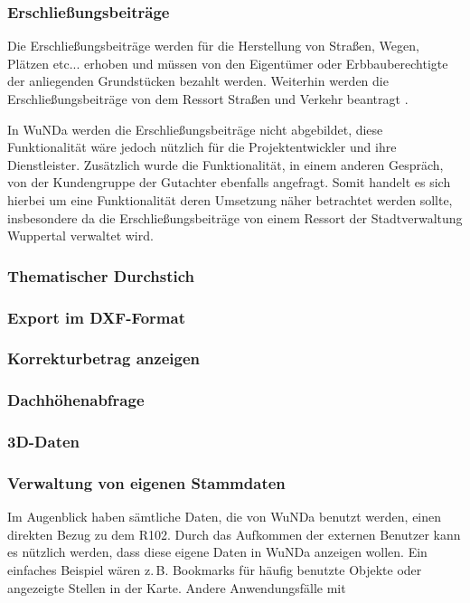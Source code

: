 \subsubsection{Erschließungsbeiträge}
Die Erschließungsbeiträge werden für die Herstellung von Straßen, Wegen, Plätzen etc... erhoben und müssen von den Eigentümer oder Erbbauberechtigte der anliegenden Grundstücken bezahlt werden.
Weiterhin werden die Erschließungsbeiträge von dem Ressort Straßen und Verkehr beantragt \autocite[vgl.][]{wupp-erschliessungsbeitrag}.

In \ac{WuNDa} werden die Erschließungsbeiträge nicht abgebildet, diese Funktionalität wäre jedoch nützlich für die Projektentwickler und ihre Dienstleister.
Zusätzlich wurde die Funktionalität, in einem anderen Gespräch, von der Kundengruppe der Gutachter ebenfalls angefragt.
Somit handelt es sich hierbei um eine Funktionalität deren Umsetzung näher betrachtet werden sollte, insbesondere da die Erschließungsbeiträge von einem Ressort der Stadtverwaltung Wuppertal verwaltet wird.
\subsubsection{Thematischer Durchstich}
\subsubsection{Export im DXF-Format}
\subsubsection{Korrekturbetrag anzeigen}
\subsubsection{Dachhöhenabfrage}
\subsubsection{3D-Daten}
\subsubsection{Verwaltung von eigenen Stammdaten}
Im Augenblick haben sämtliche Daten, die von \ac{WuNDa} benutzt werden, einen direkten Bezug zu dem R102.
Durch das Aufkommen der externen Benutzer kann es nützlich werden, dass diese eigene Daten in \ac{WuNDa} anzeigen wollen.
Ein einfaches Beispiel wären z.\,B. Bookmarks für häufig benutzte Objekte oder angezeigte Stellen in der Karte.
Andere Anwendungsfälle mit 
